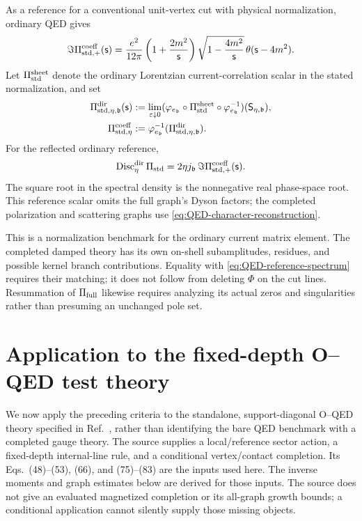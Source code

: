 \documentclass[final,5p,times,twocolumn,numbers,nopreprintline]{elsarticle}
\numberwithin{equation}{section}
\theoremstyle{definition}
\theoremstyle{remark}
\newcommand{\bb}{\mathfrak b}
\newcommand{\Ph}{\Phi}
\newcommand{\Disc}{\operatorname{Disc}}
\newcommand{\ee}{e_{\bb}}
\newcommand{\je}{j_{\bb}}
\newcommand{\embed}{\varphi_{\ee}}
\newcommand{\sMand}{\mathsf{s}}
\begin{document}
As a reference for a conventional unit-vertex cut with physical
normalization, ordinary QED gives
\begin{equation}
 \Im\Pi^{\rm coeff}_{{\rm std},+}(\sMand)
  =\frac{e^2}{12\pi}
    \left(1+\frac{2m^2}{\sMand}\right)
       \sqrt{1-\frac{4m^2}{\sMand}}\,
       \theta(\sMand-4m^2).
 \label{eq:QED-reference-spectrum}
\end{equation}
Let \(\Pi_{\rm std}^{\rm sheet}\) denote the ordinary
Lorentzian current-correlation scalar in the stated normalization,
and set
\begin{equation}
\begin{aligned}
 \Pi^{\rm dir}_{{\rm std},\eta,\bb}(\sMand)
  &:=\lim_{\varepsilon\downarrow0}
    (\embed\circ\Pi^{\rm sheet}_{\rm std}
                   \circ\embed^{-1})(\mathsf S_{\eta,\bb}),\\
 \Pi^{\rm coeff}_{{\rm std},\eta}
       &:=\embed^{-1}(\Pi^{\rm dir}_{{\rm std},\eta,\bb}).
\end{aligned}
 \label{eq:QED-directed-spectrum-interface}
\end{equation}
For the reflected ordinary reference,
\begin{equation}
 \Disc^{\rm dir}_\eta\Pi_{\rm std}
 =2\eta\je\,
                  \Im\Pi^{\rm coeff}_{{\rm std},+}(\sMand).
 \label{eq:QED-directed-reference-jump}
\end{equation}
The square root in the spectral density is the nonnegative real
phase-space root. This reference scalar omits the full graph's
Dyson factors; the completed polarization and scattering graphs
use \eqref{eq:QED-character-reconstruction}.

This is a normalization benchmark for the ordinary current
matrix element. The completed damped theory has its own
on-shell subamplitudes, residues, and possible kernel branch
contributions. Equality with \eqref{eq:QED-reference-spectrum}
requires their matching; it does not follow from deleting
\(\Ph\) on the cut lines. Resummation of
\(\Pi_{\rm full}\) likewise requires analyzing its actual zeros
and singularities rather than presuming an unchanged pole set.

\section{Application to the fixed-depth O--QED test theory}
\label{sec:OQED-application}

We now apply the preceding criteria to the standalone, support-diagonal
O--QED theory specified in Ref.~\cite{ChiapponeIgnition}, rather than
identifying the bare QED benchmark with a completed gauge theory.
The source supplies a local/reference sector action, a fixed-depth
internal-line rule, and a conditional vertex/contact completion. Its
Eqs.~(48)--(53), (66), and (75)--(83) are the inputs used here. The
inverse moments and graph estimates below are derived for those inputs.
The source does not give an evaluated magnetized completion or its
all-graph growth bounds; a conditional application cannot silently
supply those missing objects.
\end{document}
